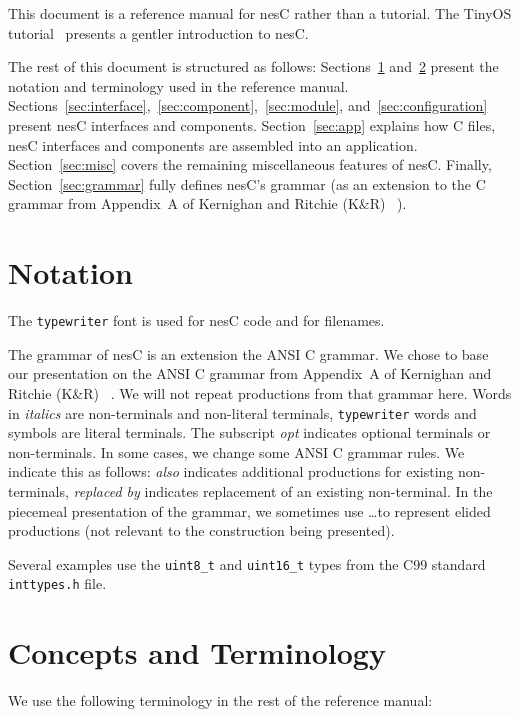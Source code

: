\documentclass[11pt]{article}
\newcommand{\kw}[1]{{\tt #1}}
\newcommand{\code}[1]{{\tt #1}}
\newcommand{\file}[1]{{\tt #1}}
\newcommand{\nesc}{nesC\xspace}
\begin{document}
This document is a reference manual for \nesc rather than a tutorial. The
TinyOS tutorial~\cite{tinyos-tutorial} presents a gentler introduction
to \nesc.

The rest of this document is structured as follows:
Sections~\ref{sec:notation} and~\ref{sec:terminology} present the notation
and terminology used in the reference manual.
Sections~\ref{sec:interface},~\ref{sec:component},~\ref{sec:module},
and~\ref{sec:configuration} present \nesc interfaces and
components. Section~\ref{sec:app} explains how C files, \nesc interfaces
and components are assembled into an application. Section~\ref{sec:misc}
covers the remaining miscellaneous features of \nesc. Finally,
Section~\ref{sec:grammar} fully defines \nesc's grammar (as an extension to
the C grammar from Appendix~A of Kernighan and Ritchie (K\&R)
~\cite[pp234--239]{kandr}).

\section{Notation}
\label{sec:notation}

The \texttt{typewriter} font is used for \nesc code and for filenames.

The grammar of \nesc is an extension the ANSI C grammar. We chose to base
our presentation on the ANSI C grammar from Appendix~A of Kernighan and
Ritchie (K\&R) ~\cite[pp234--239]{kandr}. We will not repeat productions
from that grammar here. Words in \emph{italics} are non-terminals and
non-literal terminals, \kw{typewriter} words and symbols are literal
terminals. The subscript \emph{opt} indicates optional terminals or
non-terminals. In some cases, we change some ANSI C grammar rules. We
indicate this as follows: \emph{also} indicates additional productions for
existing non-terminals, \emph{replaced by} indicates replacement of an
existing non-terminal. In the piecemeal presentation of the grammar, we
sometimes use \ldots to represent elided productions (not relevant to the
construction being presented).

Several examples use the \code{uint8\_t} and \code{uint16\_t} types from
the C99 standard \file{inttypes.h} file.

\section{Concepts and Terminology}
\label{sec:terminology}

We use the following terminology in the rest of the reference manual:
\end{document}
